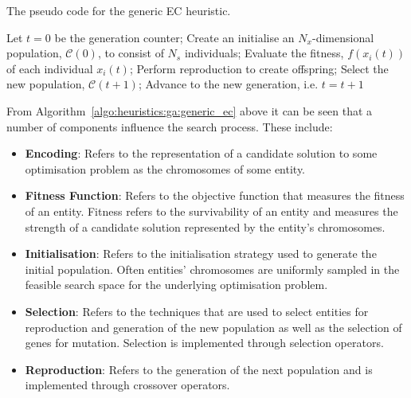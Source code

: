 \begin{algorithm}[H]
      \caption{The pseudo code for the generic \ac{EC} heuristic.}
      \label{algo:heuristics:ga:generic_ec}
      \begin{algorithmic}
            \State Let $t = 0$ be the generation counter;
            \State Create an initialise an $N_{x}$-dimensional population, $\mathcal{C}(0)$, to consist of $N_{s}$ individuals;
            \State Evaluate the fitness, $f(x_{i}(t))$ of each individual $x_{i}(t)$;
            \State Perform reproduction to create offspring;
            \State Select the new population, $\mathcal{C}(t+1)$;
            \State Advance to the new generation, i.e. $t = t + 1$
            \EndWhile
            \State
      \end{algorithmic}
\end{algorithm}

From Algorithm~\ref{algo:heuristics:ga:generic_ec} above it can be seen that a number of components influence the search process. These include:

\begin{itemize}
      \item \textbf{Encoding}: Refers to the representation of a candidate solution to some optimisation problem as the chromosomes of some entity.

      \item \textbf{Fitness Function}: Refers to the objective function that measures the fitness of an entity. Fitness refers to the survivability of an entity and measures the strength of a candidate solution represented by the entity's chromosomes.

      \item \textbf{Initialisation}: Refers to the initialisation strategy used to generate the initial population. Often entities' chromosomes are uniformly sampled in the feasible search space for the underlying optimisation problem.

      \item \textbf{Selection}: Refers to the techniques that are used to select entities for reproduction and generation of the new population as well as the selection of genes for mutation. Selection is implemented through selection operators.

      \item \textbf{Reproduction}: Refers to the generation of the next population and is implemented through crossover operators.
\end{itemize}

